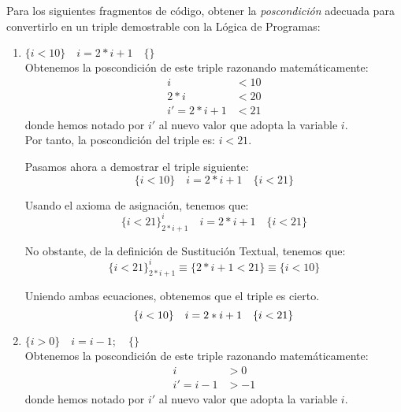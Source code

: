 \begin{ejercicio}
    Para los siguientes fragmentos de código, obtener la \emph{poscondición} adecuada para convertirlo en un triple demostrable con la Lógica de Programas:
    \begin{enumerate}
        \item $\{i < 10\} \quad i = 2 \ast i + 1 \quad \{ \}$\\
            Obtenemos la poscondición de este triple razonando matemáticamente:
            \begin{align*}
                i &< 10 \\
                2\ast i &< 20 \\
                i' = 2\ast i + 1 &< 21
            \end{align*}
            donde hemos notado por $i'$ al nuevo valor que adopta la variable $i$.\\

            Por tanto, la poscondición del triple es: $i < 21$.

            Pasamos ahora a demostrar el triple siguiente:
            \begin{equation*}
               \{i < 10\} \quad i = 2 \ast i + 1 \quad \{i<21\}
            \end{equation*}
            
            Usando el axioma de asignación, tenemos que:
            \begin{equation*}
                \{i<21\}^i_{2\ast i + 1}\quad i=2\ast i + 1\quad \{i<21\}
            \end{equation*}

            No obstante, de la definición de Sustitución Textual, tenemos que:
            \begin{equation*}
                \{i<21\}^i_{2\ast i + 1} \equiv \{2\ast i + 1 < 21\} \equiv \{i < 10\} 
            \end{equation*}
            
            Uniendo ambas ecuaciones, obtenemos que el triple es cierto.
            \begin{equation*}
                \{i<10\}\quad i=2\ast i + 1\quad \{i<21\} \\
            \end{equation*}

        \item $\{i > 0\} \quad i = i - 1; \quad \{ \}$\\
            Obtenemos la poscondición de este triple razonando matemáticamente:
            \begin{align*}
                i &> 0 \\
                i' = i - 1 &> -1
            \end{align*}
            donde hemos notado por $i'$ al nuevo valor que adopta la variable $i$.\\


\end{enumerate}
\end{ejercicio}

